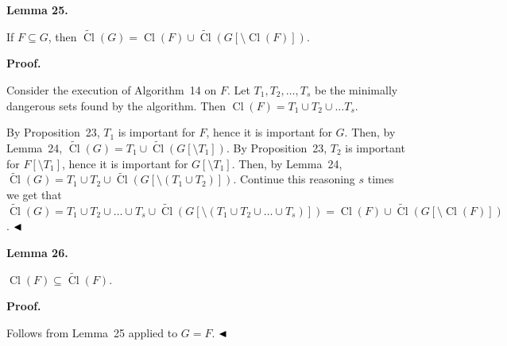 \par\medskip\noindent\textbf{
Lemma 25.
}\par



If $F\subseteq G$, then $\widetilde{\mathop{\mathrm{Cl}}}(G)=\mathop{\mathrm{Cl}}(F)\cup\widetilde{\mathop{\mathrm{Cl}}}(G[\setminus\mathop{\mathrm{Cl}}(F)])$.\par



\par\medskip\noindent\textbf{Proof.}\par


Consider the execution of Algorithm 14 on $F$.
Let $T_{1},T_{2},\dots,T_{s}$ be the minimally dangerous sets found by the algorithm. Then $\mathop{\mathrm{Cl}}(F)=T_{1}\cup T_{2}\cup\dots T_{s}$.\par



By Proposition 23, $T_{1}$ is important for $F$, hence it is important for $G$. Then, by Lemma 24, $\widetilde{\mathop{\mathrm{Cl}}}(G)=T_{1}\cup\widetilde{\mathop{\mathrm{Cl}}}(G[\setminus T_{1}])$. By Proposition 23, $T_{2}$ is important for $F[\setminus T_{1}]$, hence it is important for $G[\setminus T_{1}]$. Then, by Lemma 24, $\widetilde{\mathop{\mathrm{Cl}}}(G)=T_{1}\cup T_{2}\cup\widetilde{\mathop{\mathrm{Cl}}}(G[\setminus(T_{1}\cup T_{2})])$. Continue this reasoning $s$ times we get that $\widetilde{\mathop{\mathrm{Cl}}}(G)=T_{1}\cup T_{2}\cup\dots\cup T_{s}\cup\widetilde{\mathop{\mathrm{Cl}}}(G[\setminus(T_{1}\cup T_{2}\cup\dots\cup T_{s})])=\mathop{\mathrm{Cl}}(F)\cup\widetilde{\mathop{\mathrm{Cl}}}(G[\setminus\mathop{\mathrm{Cl}}(F)])$.
$\hfill\blacktriangleleft$\par



\par\medskip\noindent\textbf{
Lemma 26.
}\par



$\mathop{\mathrm{Cl}}(F)\subseteq\widetilde{\mathop{\mathrm{Cl}}}(F)$.\par



\par\medskip\noindent\textbf{Proof.}\par


Follows from Lemma 25 applied to $G=F$.
$\hfill\blacktriangleleft$\par



